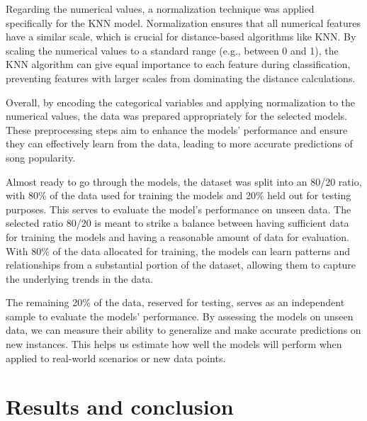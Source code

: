 \documentclass[11pt]{article} %
\begin{document}
Regarding the numerical values, a normalization technique was applied specifically for the KNN model. Normalization ensures that all numerical features have a similar scale, which is crucial for distance-based algorithms like KNN. By scaling the numerical values to a standard range (e.g., between 0 and 1), the KNN algorithm can give equal importance to each feature during classification, preventing features with larger scales from dominating the distance calculations.

Overall, by encoding the categorical variables and applying normalization to the numerical values, the data was prepared appropriately for the selected models. These preprocessing steps aim to enhance the models' performance and ensure they can effectively learn from the data, leading to more accurate predictions of song popularity.

Almost ready to go through the models, the dataset was split into an 80/20 ratio, with 80\% of the data used for training the models and 20\% held out for testing purposes. This serves to evaluate the model's performance on unseen data. The selected ratio 80/20 is meant to strike a balance between having sufficient data for training the models and having a reasonable amount of data for evaluation. With 80\% of the data allocated for training, the models can learn patterns and relationships from a substantial portion of the dataset, allowing them to capture the underlying trends in the data.

The remaining 20\% of the data, reserved for testing, serves as an independent sample to evaluate the models' performance. By assessing the models on unseen data, we can measure their ability to generalize and make accurate predictions on new instances. This helps us estimate how well the models will perform when applied to real-world scenarios or new data points.

\section{Results and conclusion}

\newpage
\end{document}
